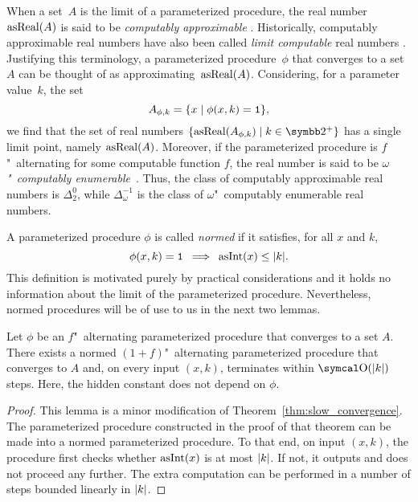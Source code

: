 When a set~$A$ is the limit of a parameterized procedure, the real number $\operatorname{asReal}(A)$ is said to be \emph{computably approximable} \parencite{ambos-spies2000weakly}.
Historically, computably approximable real numbers have also been called \emph{limit computable} real numbers \parencite{gold1965limiting}.
Justifying this terminology, a parameterized procedure~$\phi$ that converges to a set~$A$ can be thought of as approximating~$\operatorname{asReal}(A)$.
Considering, for a parameter value~$k$, the set
\begin{equation*}
  A_{\phi, k} = \{x \;|\; \phi(x, k) = \textnormal{\texttt{1}}\},
\end{equation*}
we find that the set of real numbers $\{\asReal(A_{\phi, k}) \st k \in \binary^+\}$ has a single limit point, namely $\operatorname{asReal}(A)$.
Moreover, if the parameterized procedure is $f$"~alternating for some computable function $f$, the real number is said to be \emph{$\omega$"~computably enumerable}~\parencite{ambos-spies2000weakly}.
Thus, the class of computably approximable real numbers is $\Delta^0_2$, while $\Delta^{-1}_\omega$ is the class of $\omega$"~computably enumerable real numbers.

A parameterized procedure $\phi$ is called \emph{normed} \parencite{ambos-spies2000weakly} if it satisfies, for all $x$ and $k$,
\begin{equation*}
  \phi(x, k) = \textnormal{\texttt{1}} \:\implies\: \operatorname{asInt}(x) \le {\lvert k\rvert}.
\end{equation*}
This definition is motivated purely by practical considerations and it holds no information about the limit of the parameterized procedure.
Nevertheless, normed procedures will be of use to us in the next two lemmas.
\begin{lemma}
\label{lem:slow_convergence_normed}%
  Let $\phi$ be an $f$"~alternating parameterized procedure that converges to a set $A$.
  There exists a normed $(1 + f)$"~alternating parameterized procedure that converges to $A$ and, on every input $(x, k)$, terminates within $\bigO(\length{k})$ steps.
  Here, the hidden constant does not depend on $\phi$.
\end{lemma}
\begin{proof}
  This lemma is a minor modification of Theorem~\ref{thm:slow_convergence}.
  The parameterized procedure constructed in the proof of that theorem can be made into a normed parameterized procedure.
  To that end, on input $(x, k)$, the procedure first checks whether $\operatorname{asInt}(x)$ is at most ${\lvert k\rvert}$.
  If not, it outputs  and does not proceed any further.
  The extra computation can be performed in a number of steps bounded linearly in ${\lvert k\rvert}$.
\end{proof}

